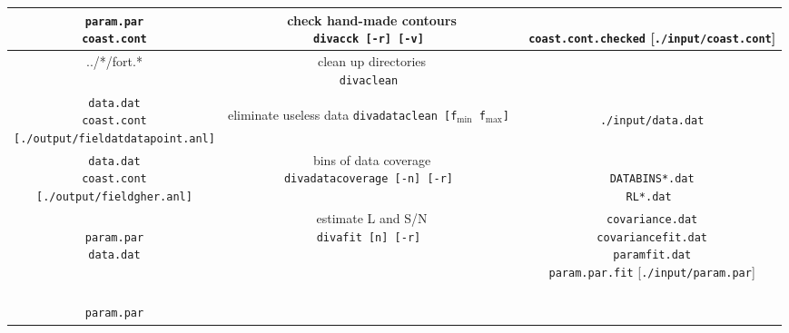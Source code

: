 \begin{table}
{{\begin{tabular}{c|c|c}
 \shortstack{
{\tt param.par} \\
{\tt coast.cont} 
}
 & 
\shortstack{
{\sf check hand-made contours} \\
{\tt divacck [-r] [-v]  } 
\\
{  { }  }
}
& 
\shortstack{
{  { }  } \\
{\tt coast.cont.checked}  { } [{\tt ./input/coast.cont}] \\
{  { }  }
}
 \\ \hline
 ../*/fort.*
 & 
 \shortstack{
 {\sf clean up directories} \\
{\tt divaclean  } 
}
& 
 { }
 \\ \hline
 \shortstack{
{\tt data.dat} \\
{\tt coast.cont} \\
{\tt [./output/fieldatdatapoint.anl]} 
}
 & 
\shortstack{
{\sf eliminate useless data} \\
{\tt divadataclean  [f$_{\min}$  f$_{\max}$]  } 
\\
{  { }  }
}
& 
\shortstack{
{  { }  } \\
{\tt ./input/data.dat} \\
{  { }  }
}
 \\ \hline
 \shortstack{
{\tt data.dat} \\
{\tt coast.cont} \\
{\tt [./output/fieldgher.anl]} 
}
 & 
\shortstack{
{\sf bins of data coverage} \\
{\tt divadatacoverage  [-n] [-r]  } 
\\
{  { }  }
}
& 
\shortstack{
{  { }  } \\
{\tt DATABINS*.dat} \\
{  {\tt RL*.dat }  }
}
 \\ \hline
 \shortstack{
 {  { }  } \\
{\tt param.par} \\
{\tt data.dat} \\
{  { }  } 
}
 & 
\shortstack{
{\sf estimate L and S/N} \\
{\tt divafit [n] [-r]  } 
\\
{  { }  } \\
{  { }  }
}
& 
\shortstack{
{\tt covariance.dat} \\
{\tt covariancefit.dat} \\
{\tt paramfit.dat} \\
{\tt param.par.fit} {  { }  } [{\tt ./input/param.par}]
}
\\ \hline
 \shortstack{
 {  { }  } \\
{\tt param.par} \\
}
\end{tabular}}}
\end{table}
